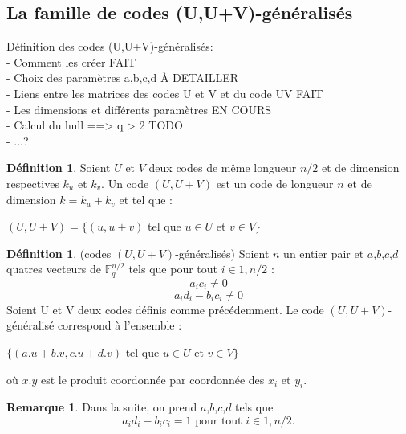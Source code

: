 \documentclass[12pt]{article}
\theoremstyle{definition}
\newtheorem{remarque}[thm]{Remarque}
\newtheorem{defi}[thm]{Définition}
\newcommand{\F}{\mathbb{F}}
\begin{document}
\subsection{La famille de codes (U,U+V)-généralisés}
Définition des codes (U,U+V)-généralisés: \\
- Comment les créer  FAIT \\
- Choix des paramètres a,b,c,d \`A DETAILLER \\
- Liens entre les matrices des codes U et V et du code UV FAIT \\
- Les dimensions et différents paramètres  EN COURS \\
- Calcul du hull ==> q > 2 TODO \\
- ...? \\


\begin{defi} Soient $U$ et $V$ deux codes de même longueur $n/2$ et de dimension respectives $k_u$ et $k_v$. Un code $(U,U+V)$ est un code de longueur $n$ et de dimension $k=k_u+k_v$ et tel que :
\begin{center}
$(U,U+V) = \{(u,u+v)$ tel que $u \in U$ et $v \in V \}$
\end{center}
\end{defi}

\begin{defi} \label{UV-normalise} (codes $(U,U+V)$-généralisés) Soient $n$ un entier pair et $a$,$b$,$c$,$d$ quatres vecteurs de $\F_q^{n/2}$ tels que pour tout $i \in {1,n/2}$ :
$$ a_ic_i \neq 0 $$
$$ a_id_i - b_ic_i \neq 0 $$
Soient U et V deux codes définis comme précédemment. Le code $(U,U+V)$-généralisé correspond à l'ensemble :
\begin{center}
$\{(a.u + b.v, c.u + d.v)$ tel que $u \in U$ et $v \in V \}$
\end{center}
où $x.y$ est le produit coordonnée par coordonnée des $x_i$ et $y_i$.
\end{defi}

\begin{remarque}
Dans la suite, on prend $a$,$b$,$c$,$d$ tels que 
$$ a_id_i - b_ic_i = 1 \text{ pour tout } i \in {1,n/2}.$$ 
\end{remarque}
\end{document}
